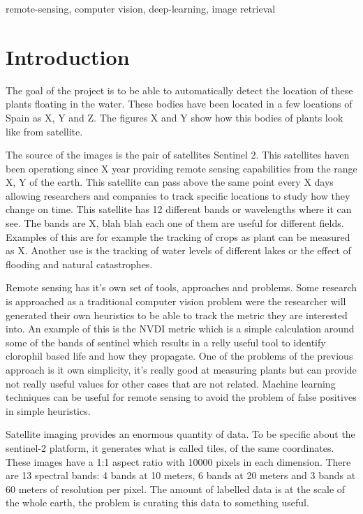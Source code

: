 \documentclass[conference]{IEEEtran}
\begin{document}
    \begin{IEEEkeywords}
        remote-sensing, computer vision, deep-learning, image retrieval
    \end{IEEEkeywords}


    \section{Introduction}
    The goal of the project is to be able to automatically detect the location of these plants
    floating in the water.
    These bodies have been located in a few locations of Spain as X, Y and Z. The figures X and Y
    show how this bodies of plants look like from satellite.

    The source of the images is the pair of satellites Sentinel 2. This satellites haven been operationg since X year
    providing remote sensing capabilities from the range X, Y of the earth.
    This satellite can pass above the same point every X days allowing researchers and companies to
    track specific locations to study how they change on time.
    This satellite has 12 different bands or wavelengths where it can see. The bands are X, blah blah
    each one of them are useful for different fields.
    Examples of this are for example the tracking of crops as plant can be measured as X.
    Another use is the tracking of water levels of different lakes or the effect of flooding and
    natural catastrophes.

    Remote sensing has it's own set of tools, approaches and problems.
    Some research is approached as a traditional computer vision problem were the researcher will
    generated their own heuristics to be able to track the metric they are interested into.
    An example of this is the NVDI metric which is a simple calculation around some of the bands of
    sentinel which results in a relly useful tool to identify clorophil based life and how they
    propagate.
    One of the problems of the previous approach is it own simplicity, it's really good at measuring
    plants but can provide not really useful values for other cases that are not related.
    Machine learning techniques can be useful for remote sensing to avoid the problem of false
    positives in simple heuristics.

    Satellite imaging provides an enormous quantity of data.
    To be specific about the sentinel-2 platform, it generates what is called tiles, of the same coordinates.
    These images have a 1:1 aspect ratio with 10000 pixels in each dimension.
    There are 13 spectral bands: 4 bands at 10 meters, 6 bands at 20 meters and 3 bands at 60 meters of
    resolution per pixel.
    The amount of labelled data is at the scale of the whole earth, the problem is curating this
    data to something useful.
\end{document}
